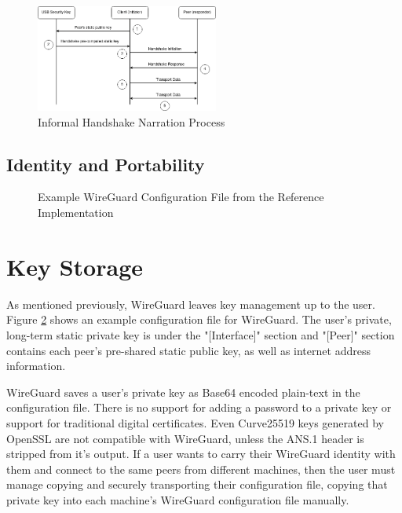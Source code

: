 \documentclass [11pt, proquest] {uwthesis}[2020/02/24]
\begin{document}
\begin{figure}[ht]
\includegraphics[width=6cm]{paper/images/Process_Diagram.drawio.png}
\caption{Informal Handshake Narration Process}
\label{fig:handshake_process}
\end{figure}

\subsection {Identity and Portability}
\label{identity}

\begin{figure}[ht]
\caption{Example WireGuard Configuration File from the Reference Implementation}
\label{fig:wg_config}
\end{figure}

\section{Key Storage}
As mentioned previously, WireGuard leaves key management up to the user.
Figure \ref{fig:wg_config} shows an example configuration file for WireGuard. The user's private, long-term static private key is under the "[Interface]" section and "[Peer]" section contains each peer's pre-shared static public key, as well as internet address information.

WireGuard saves a user's private key as Base64 encoded plain-text in the configuration file. There is no support for adding a password to a private key or support for traditional digital certificates. Even Curve25519 keys generated by OpenSSL are not compatible with WireGuard, unless the ANS.1 header is stripped from it's output.
If a user wants to carry their WireGuard identity with them and connect to the same peers from different machines, then the user must manage copying and securely transporting their configuration file, copying that private key into each machine's WireGuard configuration file manually. 
\end{document}
